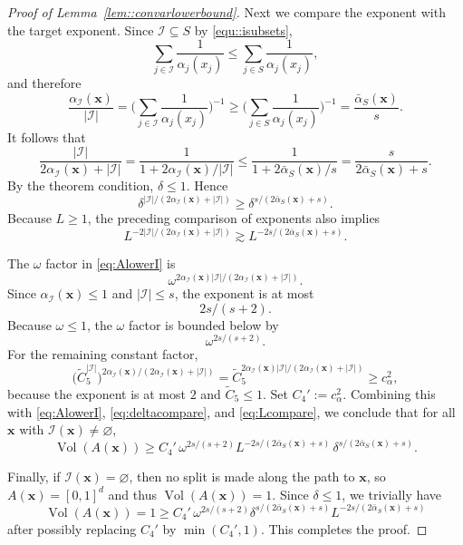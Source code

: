 \documentclass[11pt]{article}
\theoremstyle{plain}
\theoremstyle{definition}
\theoremstyle{remark}
\theoremstyle{plain}
\newcommand{\bx}{\mathbf{x}}
\DeclareMathOperator{\Vol}{Vol}
\newcommand{\1}{\mathbbm{1}}
\begin{document}
\begin{proof}[Proof of Lemma~\ref{lem::convarlowerbound}]
Next we compare the exponent with the target exponent.
Since $\mathcal I\subseteq S$ by \eqref{equ::isubsets},
\[
\sum_{j\in\mathcal I}\frac{1}{\alpha_j(x_j)}
\le
\sum_{j\in S}\frac{1}{\alpha_j(x_j)},
\]
and therefore
\[
\frac{\alpha_{\mathcal I}(\bx)}{|\mathcal I|}
=
\Biggl(\sum_{j\in\mathcal I}\frac{1}{\alpha_j(x_j)}\Biggr)^{-1}
\ge
\Biggl(\sum_{j\in S}\frac{1}{\alpha_j(x_j)}\Biggr)^{-1}
=
\frac{\bar\alpha_S(\bx)}{s}.
\]
It follows that
\[
\frac{|\mathcal I|}{2\alpha_{\mathcal I}(\bx)+|\mathcal I|}
=
\frac{1}{1+2\alpha_{\mathcal I}(\bx)/|\mathcal I|}
\le
\frac{1}{1+2\bar\alpha_S(\bx)/s}
=
\frac{s}{2\bar\alpha_S(\bx)+s}.
\]
By the theorem condition, $\delta\le1$. Hence
\begin{equation}\label{eq:deltacompare}
\delta^{|\mathcal I|/(2\alpha_{\mathcal I}(\bx)+|\mathcal I|)}
\ge
\delta^{s/(2\bar\alpha_S(\bx)+s)}.
\end{equation}
Because $L\ge1$, the preceding comparison of exponents also implies
\begin{equation}\label{eq:Lcompare}
L^{-2|\mathcal I|/(2\alpha_{\mathcal I}(\bx)+|\mathcal I|)}
\gtrsim
L^{-2s/(2\bar\alpha_S(\bx)+s)}.
\end{equation}

The $\omega$ factor in \eqref{eq:AlowerI} is
\[
\omega^{
2\alpha_{\mathcal I}(\bx)|\mathcal I|/
(2\alpha_{\mathcal I}(\bx)+|\mathcal I|)
}.
\]
Since $\alpha_{\mathcal I}(\bx)\le1$ and $|\mathcal I|\le s$, the exponent is at most
\[
2s/(s+2).
\]
Because $\omega\le1$, the $\omega$ factor is bounded below by
\[
\omega^{2s/(s+2)}.
\]
For the remaining constant factor,
\[
\bigl(\widetilde C_5^{|\mathcal I|}\bigr)^{
2\alpha_{\mathcal I}(\bx)/(2\alpha_{\mathcal I}(\bx)+|\mathcal I|)
}
=
\widetilde C_5^{
2\alpha_{\mathcal I}(\bx)|\mathcal I|/
(2\alpha_{\mathcal I}(\bx)+|\mathcal I|)
}
\ge c_\alpha^2,
\]
because the exponent is at most $2$ and $\widetilde C_5\le1$.
Set $C_4':=c_\alpha^2$.
Combining this with \eqref{eq:AlowerI}, \eqref{eq:deltacompare}, and \eqref{eq:Lcompare}, we conclude that
for all $\bx$ with $\mathcal I(\bx)\neq\varnothing$,
\[
	\Vol(A(\bx))
	\ge
	C_4'\,
	\omega^{2s/(s+2)}
	L^{-2s/(2\bar\alpha_S(\bx)+s)}\,
	\delta^{s/(2\bar\alpha_S(\bx)+s)}.
\]

Finally, if $\mathcal I(\bx)=\varnothing$, then no split is made along the path to $\bx$,
so $A(\bx)=[0,1]^d$ and thus $\Vol(A(\bx))=1$.
Since $\delta\le 1$, we trivially have
\[
	\Vol(A(\bx))=1\ge C_4'\,\omega^{2s/(s+2)}
	\delta^{s/(2\bar\alpha_S(\bx)+s)}
	L^{-2s/(2\bar\alpha_S(\bx)+s)}
\]
after possibly replacing $C_4'$ by $\min(C_4',1)$.
This completes the proof.
\end{proof}
\end{document}

